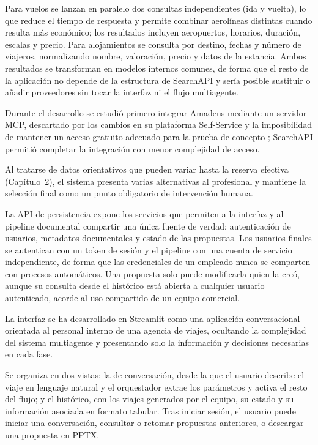 Para vuelos se lanzan en paralelo dos consultas independientes (ida y vuelta), lo que reduce el tiempo de respuesta y permite combinar aerolíneas distintas cuando resulta más económico; los resultados incluyen aeropuertos, horarios, duración, escalas y precio. Para alojamientos se consulta por destino, fechas y número de viajeros, normalizando nombre, valoración, precio y datos de la estancia. Ambos resultados se transforman en modelos internos comunes, de forma que el resto de la aplicación no depende de la estructura de SearchAPI y sería posible sustituir o añadir proveedores sin tocar la interfaz ni el flujo multiagente.

Durante el desarrollo se estudió primero integrar Amadeus mediante un servidor MCP, descartado por los cambios en su plataforma Self-Service y la imposibilidad de mantener un acceso gratuito adecuado para la prueba de concepto \parencite{amadeus2026developers}; SearchAPI permitió completar la integración con menor complejidad de acceso.

Al tratarse de datos orientativos que pueden variar hasta la reserva efectiva (Capítulo~2), el sistema presenta varias alternativas al profesional y mantiene la selección final
como un punto obligatorio de intervención humana.

La API de persistencia expone los servicios que permiten a la interfaz y al pipeline documental compartir una única fuente de verdad: autenticación de usuarios, metadatos documentales y estado de las propuestas. Los usuarios finales se autentican con un token de sesión y el pipeline con una cuenta de servicio independiente, de forma que las credenciales de un empleado nunca se comparten con procesos automáticos. Una propuesta solo puede modificarla quien la creó, aunque su consulta desde el histórico está abierta a cualquier usuario autenticado, acorde al uso compartido de un equipo comercial.


La interfaz se ha desarrollado en Streamlit como una aplicación conversacional orientada al personal interno de una agencia de viajes, ocultando la complejidad del sistema multiagente y presentando solo la información y decisiones necesarias en cada fase.

Se organiza en dos vistas: la de conversación, desde la que el usuario describe el viaje en lenguaje natural y el orquestador extrae los parámetros y activa el resto del flujo; y el histórico, con los viajes generados por el equipo, su estado y su información asociada en formato tabular. Tras iniciar sesión, el usuario puede iniciar una conversación, consultar o retomar propuestas anteriores, o descargar una propuesta en PPTX.

